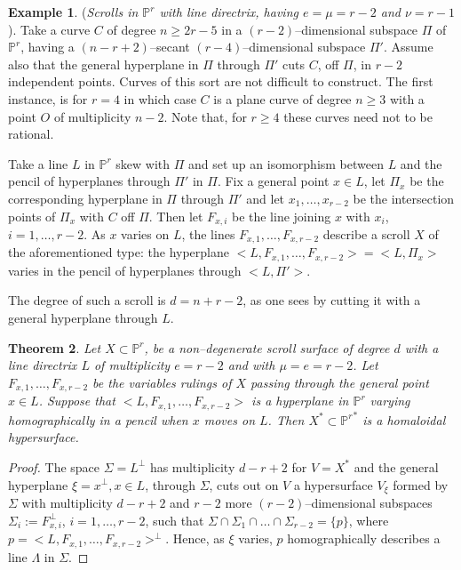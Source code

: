 \documentclass[11pt]{article}   %
\newtheorem{Theorem}{Theorem}
\theoremstyle{definition}
\newtheorem{Example}[Theorem]{Example}
\numberwithin{Theorem}{section} \numberwithin{equation}{section}
\newcommand{\p}{{\mathbb P}}
\begin{document}
{\begin{Example}\label{hypscroll}\rm ({\it Scrolls in $\p^r$ with
 line directrix, having $e=\mu=r-2$ and $\nu=r-1$}).
 Take a curve $C$ of degree $n\geq 2r-5$ in a $(r-2)$--dimensional subspace
 $\Pi$ of $\p^ r$, having a  $(n-r+2)$--secant $(r-4)$--dimensional subspace $\Pi'$.
 Assume also that the general hyperplane in $\Pi$ through $\Pi'$
 cuts $C$, off $\Pi$, in $r-2$ independent points.
 Curves of this sort are not difficult to construct. The first instance, is for
 $r=4$ in which case $C$ is a plane curve of degree $n\geq 3$ with a
point $O$ of multiplicity $n-2$. Note that, for $r\geq 4$ these curves
need not to be rational.

 Take a line $L$ in $\p^ r$ skew with $\Pi$  and
 set up an isomorphism between
$L$ and the pencil of hyperplanes through $\Pi'$ in $\Pi$. Fix a general point
$x\in L$, let $\Pi_x$ be the corresponding hyperplane in $\Pi$ through $\Pi'$
and let $x_1,\dots, x_{r-2}$ be the intersection points of $\Pi_x$ with $C$ off $\Pi$.
Then let $F_{x,i}$ be the line joining $x$ with $x_i$, $i=1,\dots,r-2$.
As $x$ varies on $L$, the lines $F_{x,1},\dots, F_{x,r-2}$ describe a scroll $X$
of the aforementioned type: the hyperplane
$<L,F_{x,1},\dots, F_{x,r-2}>=<L,\Pi_x>$ varies in the pencil of hyperplanes
through $<L,\Pi'>$.

The degree of such a scroll is $d=n+r-2$, as one sees by cutting it with a
general hyperplane through $L$.
\end{Example}
\medskip


\begin{Theorem}\label{Dhyperi}
Let $X\subset \p^ r$, be a non--degenerate scroll surface of degree
$d$ with a line directrix $L$ of multiplicity $e=r-2$ and with $\mu=e=r-2$.
Let $F_{x,1},\dots, F_{x,r-2}$ be the variables rulings of
$X$ passing through the general point $x\in L$. Suppose that  $<L,F_{x,1},\dots,F_{x,r-2}>$
is a hyperplane in $\p^r$ varying
homographically  in a pencil when $x$ moves on $L$.
Then $X^ *\subset {\p^r}^*$ is a
homaloidal hypersurface.
\end{Theorem}

\begin{proof} The space $\Sigma=L^ \perp$ has multiplicity $d-r+2$ for
$V=X^ *$ and the general hyperplane $\xi=x^ \perp, x\in L$, through
$\Sigma$, cuts out on $V$ a hypersurface $V_\xi$ formed by
$\Sigma$ with multiplicity $d-r+2$ and $r-2$ more $(r-2)$--dimensional subspaces
$\Sigma_i:=F_{x,i}^ \perp$, $i=1,\dots,r-2$, such that
$\Sigma\cap\Sigma_1\cap\dots\cap \Sigma_{r-2}=\{p\}$, where
$p=<L,F_{x,1},\dots,F_{x,r-2}>^ \perp$. Hence, as $\xi$ varies, $p$
homographically describes a line $\Lambda$ in $\Sigma$.


\end{proof}}
\end{document}

